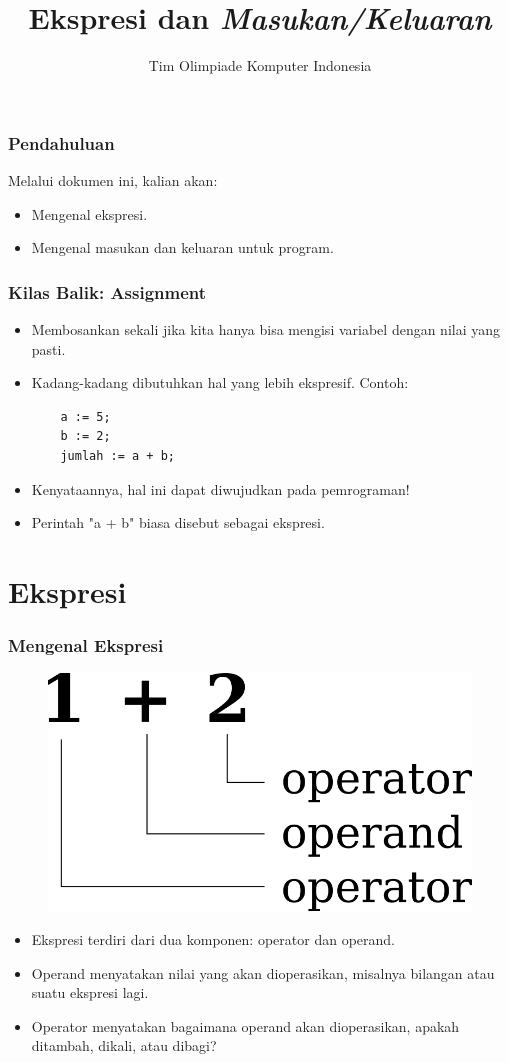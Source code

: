 

\title{Ekspresi dan \textit{Masukan/Keluaran}}
\author{Tim Olimpiade Komputer Indonesia}
\date{}



\begin{frame}
\titlepage
\end{frame}

\begin{frame}
\frametitle{Pendahuluan}
Melalui dokumen ini, kalian akan:
\begin{itemize}
  \item Mengenal ekspresi.
  \item Mengenal masukan dan keluaran untuk program.
\end{itemize}
\end{frame}

\begin{frame}[fragile]
\frametitle{Kilas Balik: Assignment}
\begin{itemize}
  \item Membosankan sekali jika kita hanya bisa mengisi variabel dengan nilai yang pasti. 
  \item Kadang-kadang dibutuhkan hal yang lebih ekspresif. Contoh:
  \begin{lstlisting}
    a := 5;
    b := 2;
    jumlah := a + b;
  \end{lstlisting}
  \item Kenyataannya, hal ini dapat diwujudkan pada pemrograman!
  \item Perintah "a + b" biasa disebut sebagai \alert{ekspresi}.
\end{itemize}
\end{frame}

\section{Ekspresi}
\frame{\sectionpage}

\begin{frame}
\frametitle{Mengenal Ekspresi}
\begin{figure}
  \centering
  \includegraphics[width=4 cm]{asset/ekspresi.png}
\end{figure}
\begin{itemize}
  \item Ekspresi terdiri dari dua komponen: \alert{operator} dan \alert{operand}.
  \item Operand menyatakan nilai yang akan dioperasikan, misalnya bilangan atau suatu ekspresi lagi.
  \item Operator menyatakan bagaimana operand akan dioperasikan, apakah ditambah, dikali, atau dibagi?
\end{itemize}
\end{frame}

